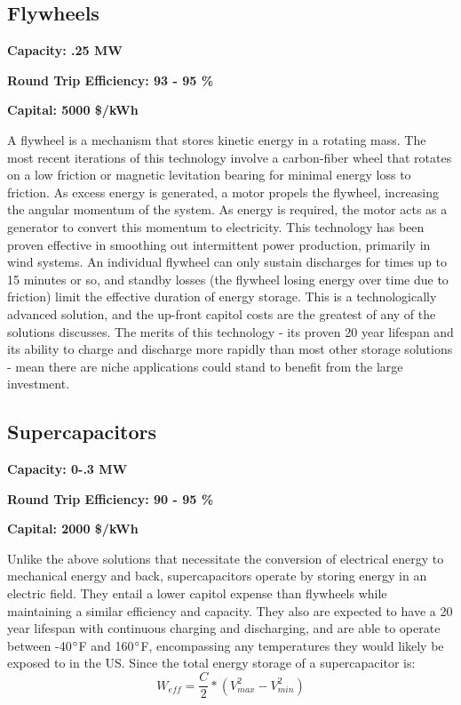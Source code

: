 \subsection{Flywheels}
\textbf{Capacity: .25 MW}

\noindent\textbf{Round Trip Efficiency: 93 - 95 \%}

\noindent\textbf{Capital: 5000 \$/kWh}

A flywheel is a mechanism that stores kinetic energy in a rotating mass. The
most recent iterations of this technology involve a carbon-fiber wheel that
rotates on a low friction or magnetic levitation bearing for minimal energy
loss to friction. As excess energy is generated, a motor propels the flywheel,
increasing the angular momentum of the system. As energy is required, the motor
acts as a generator to convert this momentum to electricity. This technology
has been proven effective in smoothing out intermittent power production,
primarily in wind systems. An individual flywheel can only sustain discharges
for times up to 15 minutes or so, and standby losses (the flywheel losing
energy over time due to friction) limit the effective duration of energy
storage.  This is a technologically advanced solution, and the up-front capitol
costs are the greatest of any of the solutions discusses. The merits of this
technology - its proven 20 year lifespan and its ability to charge and
discharge more rapidly than most other storage solutions - mean there are niche
applications could stand to benefit from the large investment.


\subsection{Supercapacitors}
\textbf{Capacity: 0-.3 MW}

\noindent\textbf{Round Trip Efficiency: 90 - 95 \%}

\noindent\textbf{Capital: 2000 \$/kWh}

Unlike the above solutions that necessitate the conversion of electrical energy
to mechanical energy and back, supercapacitors operate by storing energy in an
electric field. They entail a lower capitol expense than flywheels while
maintaining a similar efficiency and capacity. They also are expected to have a
20 year lifespan with continuous charging and discharging, and are able to
operate between -40$\degree$F and 160$\degree$F, encompassing any temperatures they
would likely be exposed to in the US. Since the total energy storage of a supercapacitor is:
\begin{equation}
W_{eff}=\frac{C}{2}*(V^2_{max}-V^2_{min})
\end{equation}

